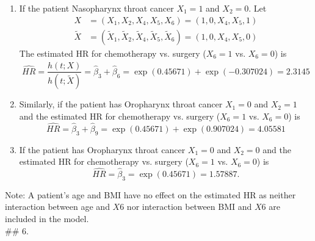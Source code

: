 \documentclass[
]{article}
\begin{document}
\begin{enumerate}
\item If the patient Nasopharynx throat cancer $X_1=1$ and $X_2=0$. Let 
\begin{align*}
X &= (X_1,X_2,X_4,X_5,X_6) = (1,0,X_4,X_5,1) \\
\tilde{X} &= (\tilde{X}_1,\tilde{X}_2,\tilde{X}_4,\tilde{X}_5,\tilde{X}_6) = (1,0,X_4,X_5,0)
\end{align*} 
The estimated HR for chemotherapy vs. surgery ($X_6=1$ vs. $X_6=0$) is
\[
\hat{HR} = \frac{\hat{h}(t;X)}{\hat{h}(t;\tilde{X})} = \hat{\beta}_3 + \hat{\beta}_6 = \exp(0.45671) + \exp(-0.307024) = 2.3145
\]
\item Similarly, if the patient has Oropharynx throat cancer $X_1=0$ and $X_2=1$ and the estimated HR for chemotherapy vs. surgery ($X_6=1$ vs. $X_6=0$) is
\[
\hat{HR} = \hat{\beta}_3 + \hat{\beta}_9 = \exp(0.45671) + \exp(0.907024) = 4.05581
\]
\item If the patient has Oropharynx throat cancer $X_1=0$ and $X_2=0$ and the estimated HR for chemotherapy vs. surgery ($X_6=1$ vs. $X_6=0$) is
\[
\hat{HR} = \hat{\beta}_3 = \exp(0.45671) = 1.57887.
\]
\end{enumerate}

Note: A patient's age and BMI have no effect on the estimated HR as
neither interaction between age and \(X6\) nor interaction between BMI
and \(X6\) are included in the model.\\
\#\# 6.
\end{document}
